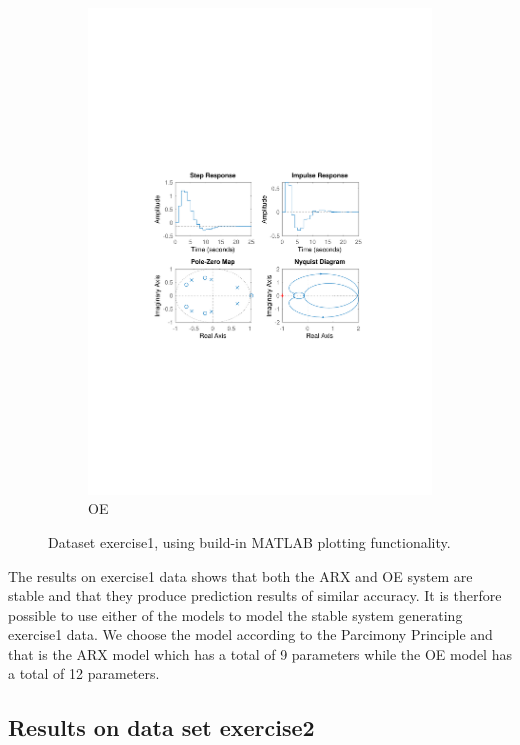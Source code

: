 \documentclass[]{article}
\begin{document}
\begin{figure}[ht]
\begin{subfigure}{.49\textwidth}
	\includegraphics[trim= 10cm 8cm 10cm 8cm, scale=0.4]{figures/3-OE-Ex1.pdf}
	\caption{OE}
	\label{fig:Ex1-OE}
\end{subfigure}
\caption{Dataset exercise1, using build-in MATLAB plotting functionality.}
\label{fig:Ex1}
\end{figure}

The results on exercise1 data shows that both the ARX and OE system are stable and that they produce prediction results of similar accuracy. It is therfore possible to use either of the models to model the stable system generating exercise1 data. We choose the model according to the Parcimony Principle and that is the ARX model which has a total of 9 parameters while the OE model has a total of 12 parameters.

\subsection{Results on data set exercise2}
\end{document}
